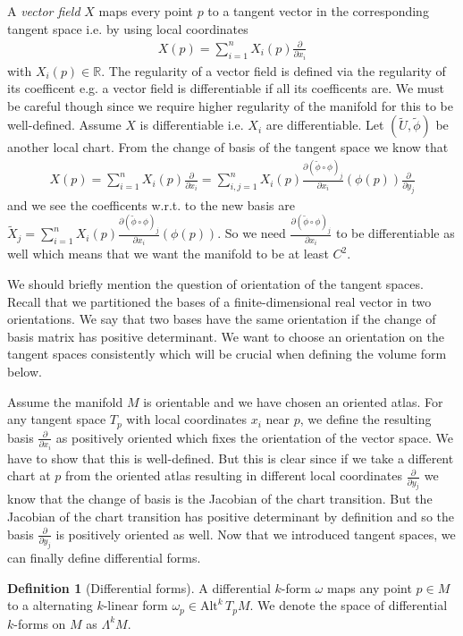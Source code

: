 \documentclass[12pt,a4paper]{article}
\numberwithin{equation}{subsection}
\numberwithin{lemma}{subsection}
\theoremstyle{definition}
\newtheorem{definition}[lemma]{Definition}
\newcommand{\alternating}[2]{ {\text{Alt}^{#1}\,#2} }
\newcommand{\real}{\mathbb{R}}
\begin{document}
A \textit{vector field} $X$ maps every point $p$ to a tangent vector 
in the corresponding tangent space i.e. by using local coordinates
\begin{align*}
    X(p) = \sum_{i=1}^n X_i(p) \frac{\partial}{\partial x_i}
\end{align*}
with $X_i(p) \in \real$. The regularity of a vector field is defined via the
regularity of its coefficent e.g. a vector field is differentiable if 
all its coefficents are. We must be careful though since we require higher 
regularity of the manifold for this to be well-defined. 
Assume $X$ is differentiable i.e. $X_i$ are differentiable. 
Let $(\tilde{U}, \tilde{\phi})$ 
be another local chart.
From the 
change of basis of the tangent space we know that 
\begin{align*}
    X(p) = \sum_{i=1}^n X_i(p) \frac{\partial}{\partial x_i}
    = \sum_{i,j=1}^n X_i(p) \frac{\partial (\tilde{\phi} \circ \phi)_j}{\partial x_i}(\phi(p))
        \frac{\partial}{\partial y_j}
\end{align*}
and we see the coefficents w.r.t. to the new basis are 
$\tilde{X}_j = \sum_{i=1}^n X_i(p) \frac{\partial (\tilde{\phi} \circ \phi)_j}{\partial x_i}(\phi(p))$.
So we need $\frac{\partial (\tilde{\phi} \circ \phi)_j}{\partial x_i}$ to be 
differentiable as well which means that we want the manifold to be at least $C^2$.

We should briefly mention the question of orientation of the tangent spaces.
Recall that we partitioned the bases of a finite-dimensional real vector 
in two orientations. We say that two bases have the same 
orientation if the change of basis matrix has positive determinant.
We want to choose an orientation on the tangent spaces consistently which 
will be crucial when defining the volume form below.

Assume the manifold $M$ is orientable and we have chosen an oriented atlas.
For any tangent space $T_p$ with local coordinates $x_i$ near $p$, 
we define the resulting basis $\frac{\partial}{\partial x_i}$ as positively
oriented which fixes the orientation of the vector space. We have to show 
that this is well-defined. But this is clear since if we take a different 
chart at $p$ from the oriented atlas resulting in different local coordinates 
$\frac{\partial}{\partial y_j}$
we know that the change of 
basis is the Jacobian of the chart transition. But the Jacobian of the 
chart transition has positive determinant by definition and so the basis 
$\frac{\partial}{\partial y_j}$ is positively oriented as well.
Now that we introduced tangent spaces, we can finally define differential forms.
\begin{definition}[Differential forms]
    A differential $k$-form $\omega$ maps any point $p \in M$ to a 
    alternating $k$-linear form $\omega_p \in \alternating{k}{T_p M}$.
    We denote the space of differential $k$-forms on $M$ as $\Lambda^k M$.
\end{definition}
\end{document}
